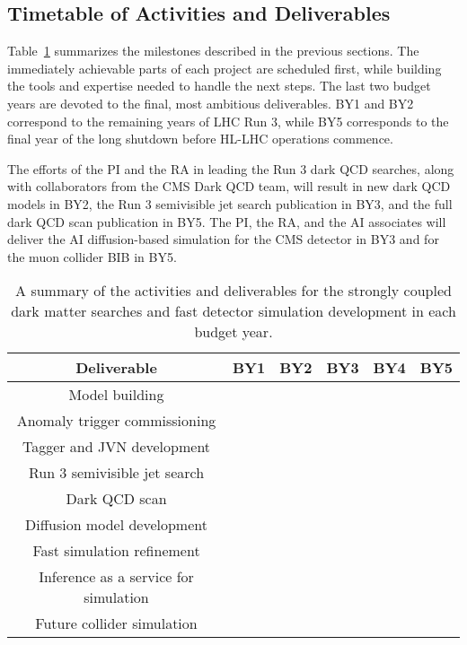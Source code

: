 \subsection{Timetable of Activities and Deliverables}

Table~\ref{tab:activities} summarizes the milestones described in the previous sections.
The immediately achievable parts of each project are scheduled first,
while building the tools and expertise needed to handle the next steps.
The last two budget years are devoted to the final, most ambitious deliverables.
BY1 and BY2 correspond to the remaining years of LHC Run 3, while BY5 corresponds to the final year of the long shutdown before HL-LHC operations commence.

The efforts of the PI and the RA in leading the Run 3 dark QCD searches, along with collaborators from the CMS Dark QCD team,
will result in new dark QCD models in BY2, the Run 3 semivisible jet search publication in BY3, and the full dark QCD scan publication in BY5.
The PI, the RA, and the AI associates will deliver the AI diffusion-based simulation for the CMS detector in BY3
and for the muon collider BIB in BY5.

\begin{table}[!hbtp]
\vspace{\myfigurespacing}
\begin{center}
\begin{tabular}{|c|c|c|c|c|c|}
\hline
Deliverable & BY1 & BY2 & BY3 & BY4 & BY5 \\
\hline
Model building & \cellcolor{blue!25} & \cellcolor{blue!25} & & & \\
\hline
Anomaly trigger commissioning & \cellcolor{blue!25} & \cellcolor{blue!25} & & & \\
\hline
Tagger and JVN development & \cellcolor{blue!25} & \cellcolor{blue!25} & \cellcolor{blue!25} & & \\
\hline
Run 3 semivisible jet search & & \cellcolor{blue!50} & \cellcolor{blue!50} & & \\
\hline
Dark QCD scan & & & \cellcolor{blue!75} & \cellcolor{blue!75} & \cellcolor{blue!75} \\
\hline
\hline
Diffusion model development & \cellcolor{orange!25} & \cellcolor{orange!25} & \cellcolor{orange!25} & & \\
\hline
Fast simulation refinement & \cellcolor{orange!25} & \cellcolor{orange!25} & \cellcolor{orange!25} & & \\
\hline
Inference as a service for simulation & & \cellcolor{orange!50} & \cellcolor{orange!50} & \cellcolor{orange!50} & \\
\hline
Future collider simulation & & & & \cellcolor{orange!75} & \cellcolor{orange!75} \\
\hline
\end{tabular}
\vspace{\myfigureskip}
\caption{A summary of the activities and deliverables for the strongly coupled dark matter searches and fast detector simulation development in each budget year.}
\label{tab:activities}
\end{center}
\end{table}

\clearpage
